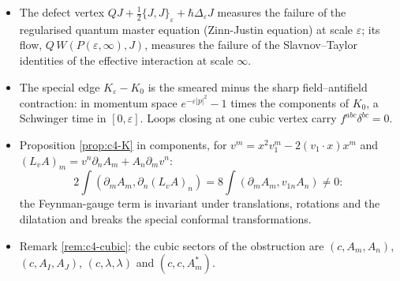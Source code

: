 \begin{remark}
\begin{itemize}
\item The defect vertex $QJ+\tfrac12\{J,J\}_\varepsilon+\hbar\Delta_\varepsilon J$ measures the failure of the regularised quantum master equation (Zinn-Justin equation) at scale $\varepsilon$; its flow, $Q\,W(P(\varepsilon,\infty),J)$, measures the failure of the Slavnov--Taylor identities of the effective interaction at scale $\infty$.
\item The special edge $K_\varepsilon-K_0$ is the smeared minus the sharp field--antifield contraction: in momentum space $e^{-\varepsilon|p|^2}-1$ times the components of $K_0$, a Schwinger time in $[0,\varepsilon]$. Loops closing at one cubic vertex carry $f^{abc}\delta^{bc}=0$.
\item Proposition \ref{prop:c4-K} in components, for $v^m=x^2v_1^m-2(v_1\cdot x)x^m$ and $(L_vA)_m=v^n\partial_nA_m+A_n\partial_mv^n$:
\[
2\int(\partial_mA_m,\partial_n(L_vA)_n)=8\int(\partial_mA_m,v_{1n}A_n)\neq0:
\]
the Feynman-gauge term is invariant under translations, rotations and the dilatation and breaks the special conformal transformations.
\item Remark \ref{rem:c4-cubic}: the cubic sectors of the obstruction are $(c,A_m,A_n)$, $(c,A_I,A_J)$, $(c,\lambda,\lambda)$ and $(c,c,A^*_m)$.
\end{itemize}
\end{remark}
